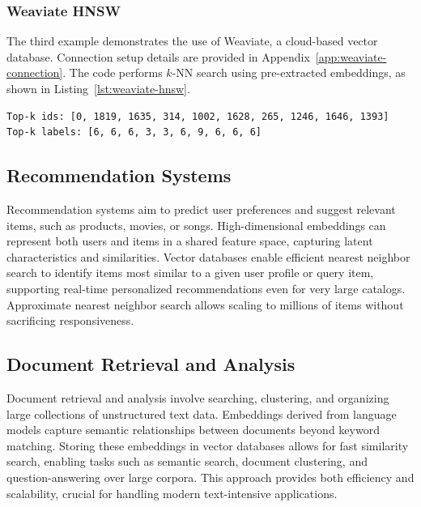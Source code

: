 \subsubsection{Weaviate HNSW}

The third example demonstrates the use of Weaviate, a cloud-based vector database. Connection setup details are provided in Appendix~\ref{app:weaviate-connection}. The code performs $k$-NN search using pre-extracted embeddings, as shown in Listing~\ref{lst:weaviate-hnsw}.


{\small
\begin{verbatim}
Top-k ids: [0, 1819, 1635, 314, 1002, 1628, 265, 1246, 1646, 1393]
Top-k labels: [6, 6, 6, 3, 3, 6, 9, 6, 6, 6]
\end{verbatim}
}

\newpage

\subsection{Recommendation Systems}

Recommendation systems aim to predict user preferences and suggest relevant items, such as products, movies, or songs. High-dimensional embeddings can represent both users and items in a shared feature space, capturing latent characteristics and similarities. Vector databases enable efficient nearest neighbor search to identify items most similar to a given user profile or query item, supporting real-time personalized recommendations even for very large catalogs. Approximate nearest neighbor search allows scaling to millions of items without sacrificing responsiveness.

\subsection{Document Retrieval and Analysis}

Document retrieval and analysis involve searching, clustering, and organizing large collections of unstructured text data. Embeddings derived from language models capture semantic relationships between documents beyond keyword matching. Storing these embeddings in vector databases allows for fast similarity search, enabling tasks such as semantic search, document clustering, and question-answering over large corpora. This approach provides both efficiency and scalability, crucial for handling modern text-intensive applications.